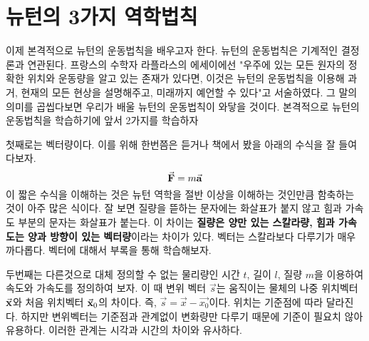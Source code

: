 \chapter{뉴턴의 3가지 역학법칙}


이제 본격적으로 뉴턴의 운동법칙을 배우고자 한다. 뉴턴의 운동법칙은 기계적인 결정론과 연관된다. 
프랑스의 수학자 라플라스의 에세이에선 "우주에 있는 모든 원자의 정확한 위치와 운동량을 알고 있는 존재가 있다면, 이것은 뉴턴의 운동법칙을 이용해 과거, 
현재의 모든 현상을 설명해주고, 미래까지 예언할 수 있다"고 서술하였다.
그 말의 의미를 곱씹다보면 우리가 배울 뉴턴의 운동법칙이 와닿을 것이다.
본격적으로 뉴턴의 운동법칙을 학습하기에 앞서 2가지를 학습하자 \\

\noindent
첫째로는 벡터량이다. 이를 위해 한번쯤은 듣거나 책에서 봤을 아래의 수식을 잘 들여다보자. 
    \begin{equation}\label{eq:newton's law 1}
      \va{F}=m\va{a} 
    \end{equation}
이 짧은 수식을 이해하는 것은 뉴턴 역학을 절반 이상을 이해하는 것인만큼 함축하는 것이 아주 많은 식이다. 
잘 보면 질량을 뜯하는 문자에는 화살표가 붙지 않고 힘과 가속도 부분의 문자는 화살표가 붙는다.
이 차이는 \textbf{질량은 양만 있는 스칼라량, 힘과 가속도는 양과 방향이 있는 벡터량}이라는 차이가 있다. 
벡터는 스칼라보다 다루기가 매우 까다롭다. 벡터에 대해서 부록을 통해 학습해보자.


두번째는 다른것으로 대체 정의할 수 없는 물리량인 시간 $t$, 길이 $l$, 질량 $m$을 이용하여 속도와 가속도를 정의하여 보자. 
이 때 변위 벡터 $\vec{s}$는 움직이는 물체의 나중 위치벡터 $\va{x}$와 처음 위치벡터 $\va{x}_0$의 차이다. 
즉, $\vec{s} = \vec{x}-\vec{x_0}$이다. 
위치는 기준점에 따라 달라진다. 
하지만 변위벡터는 기준점과 관계없이 변화량만 다루기 때문에 기준이 필요치 않아 유용하다. 
이러한 관계는 시각과 시간의 차이와 유사하다.




